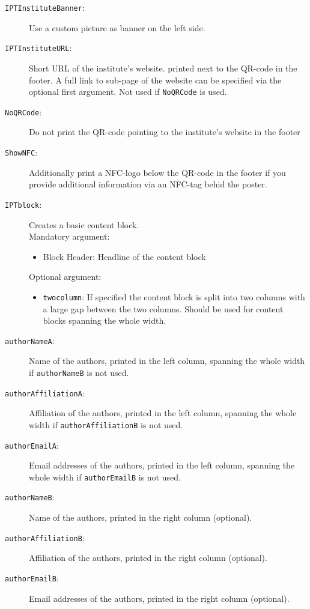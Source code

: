 \begin{description}
	\item[\texttt{IPTInstituteBanner}:] Use a custom picture as banner on the left side.

	\item[\texttt{IPTInstituteURL}:] Short URL of the institute's website. printed next to the QR-code in the footer. A full link to sub-page of the website can be specified via the optional first argument. Not used if \texttt{\bs{}NoQRCode} is used.

	\item[\texttt{NoQRCode}:] Do not print the QR-code pointing to the institute's website in the footer

	\item[\texttt{ShowNFC}:] Additionally print a NFC-logo below the QR-code in the footer if you provide additional information via an NFC-tag behid the poster.


	\item[\texttt{IPTblock}:] Creates a basic content block. \\
		Mandatory argument: 
		\begin{itemize}
			\item Block Header: Headline of the content block
		\end{itemize}
		Optional argument:
		\begin{itemize}
			\item \texttt{twocolumn}: If specified the content block is split into two columns with a large gap between the two columns. Should be used for content blocks spanning the whole width.
		\end{itemize}

	\item[\texttt{authorNameA}:] Name of the authors, printed in the left column, spanning the whole width if \texttt{authorNameB} is not used.
	\item[\texttt{authorAffiliationA}:] Affiliation of the authors, printed in the left column, spanning the whole width if \texttt{authorAffiliationB} is not used.
	\item[\texttt{authorEmailA}:] Email addresses of the authors, printed in the left column, spanning the whole width if \texttt{authorEmailB} is not used.

	\item[\texttt{authorNameB}:] Name of the authors, printed in the right column (optional).
	\item[\texttt{authorAffiliationB}:] Affiliation of the authors, printed in the right column (optional).
	\item[\texttt{authorEmailB}:] Email addresses of the authors, printed in the right column (optional).


\end{description}
